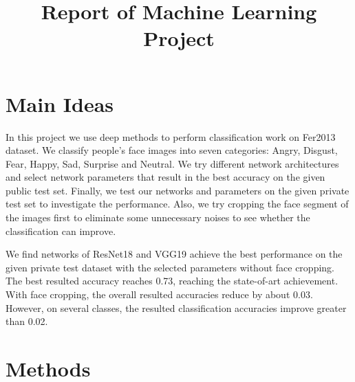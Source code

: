 \documentclass[conference]{IEEEtran}
\begin{document}
\title{Report of Machine Learning Project\\
}

\author{

\and




}

\maketitle

\section{Main Ideas}
In this project we use deep methods to perform classification work on Fer2013 dataset. We classify people's face images into seven categories: Angry, Disgust, Fear, Happy, Sad, Surprise and Neutral. We try different network architectures and select network parameters that result in the best accuracy on the given public test set. Finally, we test our networks and parameters on the given private test set to investigate the performance. Also, we try cropping the face segment of the images first to eliminate some unnecessary noises to see whether the classification can improve.

We find networks of ResNet18 and VGG19 achieve the best performance on the given private test dataset with the selected parameters without face cropping. The best resulted accuracy reaches 0.73, reaching the state-of-art achievement. With face cropping, the overall resulted accuracies reduce by about 0.03. However, on several classes, the resulted classification accuracies improve greater than 0.02.

\section{Methods}
\end{document}
